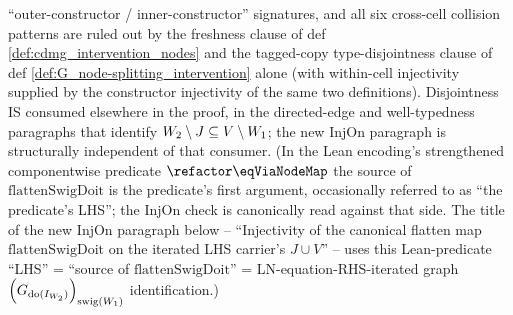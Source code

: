 \documentclass[main]{subfiles}
\providecommand{\flattenSwigDoit}{\mathrm{flattenSwigDoit}}
\begin{document}
\begin{Lem}
``outer-constructor / inner-constructor'' signatures, and all six cross-cell collision patterns are ruled out by the freshness clause of def \ref{def:cdmg_intervention_nodes} and the tagged-copy type-disjointness clause of def \ref{def:G_node-splitting_intervention} alone (with within-cell injectivity supplied by the constructor injectivity of the same two definitions). Disjointness IS consumed elsewhere in the proof, in the directed-edge and well-typedness paragraphs that identify $W_2 \setminus J \subseteq V \setminus W_1$; the new InjOn paragraph is structurally independent of that consumer. (In the Lean encoding's strengthened componentwise predicate $\refactor\eqViaNodeMap$ the source of $\flattenSwigDoit$ is the predicate's first argument, occasionally referred to as ``the predicate's LHS''; the InjOn check is canonically read against that side. The title of the new InjOn paragraph below -- ``Injectivity of the canonical flatten map $\flattenSwigDoit$ on the iterated LHS carrier's $J \cup V$'' -- uses this Lean-predicate ``LHS'' = ``source of $\flattenSwigDoit$'' = LN-equation-RHS-iterated graph $\left ( G_{\operatorname{do}(I_{W_2})} \right )_{\mathrm{swig}(W_1)}$ identification.)


\end{Lem}
\end{document}
